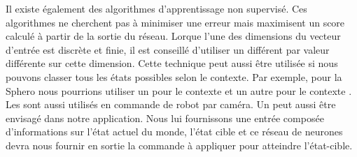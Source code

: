 Il existe également des algorithmes d'apprentissage non supervisé.
Ces algorithmes ne cherchent pas à minimiser une erreur mais maximisent un score calculé à partir de la sortie du réseau.
Lorque l'une des dimensions du vecteur d'entrée est discrète et finie, il est conseillé d'utiliser un \mlp différent par valeur différente sur cette dimension\cite{Gauthier}.
Cette technique peut aussi être utilisée si nous pouvons classer tous les états possibles selon le contexte.
Par exemple, pour la Sphero nous pourrions utiliser un \mlp pour le contexte  et un autre \mlp pour le contexte .
Les \mlp sont aussi utilisés en commande de robot par caméra\cite{Pomerleau}.
Un \mlp peut aussi être envisagé dans notre application.
Nous lui fournissons une entrée composée d'informations sur l'état actuel du monde, l'état cible et ce réseau de neurones devra nous fournir en sortie la commande à appliquer pour atteindre l'état-cible.
